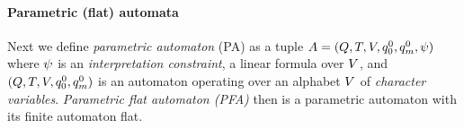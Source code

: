 \documentclass[sigplan,review,anonymous]{acmart}\settopmatter{printfolios=true,printccs=false,printacmref=false}
\begin{document}
\paragraph{Parametric (flat) automata}
Next we define \emph{parametric automaton} (PA) as a tuple $A = (Q,T,V,q_{0}^{0},q_{m}^{0},\psi)$ where $\psi$ is an \emph{interpretation constraint}, a linear formula over $V$, and $(Q,T,V,q_{0}^{0},q_{m}^{0})$ is an automaton operating over an alphabet $V$ of \emph{character variables}. \emph{Parametric flat automaton (PFA)} then is a parametric automaton with its finite automaton flat.

%
%		
%
%
%
% 		
%
%
\end{document}
